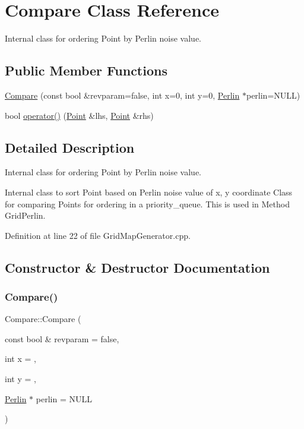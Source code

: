 \hypertarget{class_compare}{}\section{Compare Class Reference}
\label{class_compare}


Internal class for ordering Point by Perlin noise value.  


\subsection*{Public Member Functions}
\begin{DoxyCompactItemize}
\item 
\mbox{\hyperlink{class_compare_a94ef7da9625fc5eacb446dacbec8876d}{Compare}} (const bool \&revparam=false, int x=0, int y=0, \mbox{\hyperlink{class_world_architect_1_1_perlin}{Perlin}} $\ast$perlin=N\+U\+LL)
\item 
bool \mbox{\hyperlink{class_compare_ad6580c74acb6c4953248f062cffe4814}{operator()}} (\mbox{\hyperlink{namespace_world_architect_afe984ab247ed2917d3a738c7d83d33ca}{Point}} \&lhs, \mbox{\hyperlink{namespace_world_architect_afe984ab247ed2917d3a738c7d83d33ca}{Point}} \&rhs)
\end{DoxyCompactItemize}


\subsection{Detailed Description}
Internal class for ordering Point by Perlin noise value. 

Internal class to sort Point based on Perlin noise value of x, y coordinate Class for comparing Points for ordering in a priority\+\_\+queue. This is used in Method Grid\+Perlin. 

Definition at line 22 of file Grid\+Map\+Generator.\+cpp.



\subsection{Constructor \& Destructor Documentation}
\mbox{\label{class_compare_a94ef7da9625fc5eacb446dacbec8876d}} 
\subsubsection{\texorpdfstring{Compare()}{Compare()}}
{\footnotesize\ttfamily Compare\+::\+Compare (\begin{DoxyParamCaption}\item[{const bool \&}]{revparam = {\ttfamily false},  }\item[{int}]{x = {},  }\item[{int}]{y = {},  }\item[{\mbox{\hyperlink{class_world_architect_1_1_perlin}{Perlin}} $\ast$}]{perlin = {\ttfamily NULL} }\end{DoxyParamCaption})\hspace{0.3cm}{\ttfamily [inline]}}



